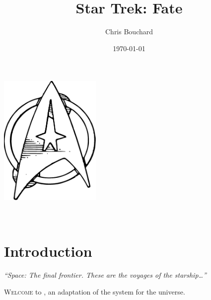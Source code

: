 \documentclass[12pt,titlepage,openany]{book}
\title{Star Trek: Fate}
\author{Chris Bouchard}
\date{\yyyymmdddate\today}
\begin{document}
\begin{titlepage}
    \vspace*{0.5in}
    \begin{center}
        \includegraphics[height=2.5in]{img/CommBadge.eps}\\
        \vspace*{0.4in}
        {\fontsize{0.75in}{1em}\selectfont\STFLogo}\\
        \vspace*{\fill}
        {\fontsize{0.3in}{1em}\selectfont{}\theauthor}\\
        \vspace*{0.2in}
        {\fontsize{0.25in}{1em}\selectfont{}\thedate}
    \end{center}
\end{titlepage}

\cleardoublepage

\begin{center}
    \parbox{0.85\linewidth}{}
\end{center}
\cleardoublepage

\tableofcontents
\cleardoublepage




\chapter{Introduction}\label{chap:intro}

\begin{center}
\textit{``Space: The final frontier. These are the voyages of the starship\ldots''}
\end{center}

\vspace{1em}

\noindent
\lettrine[lines=1]{W}{elcome} to \StarTrekFate{}, an adaptation of the
\FateCore{} system for the \StarTrek{} universe.
\end{document}
